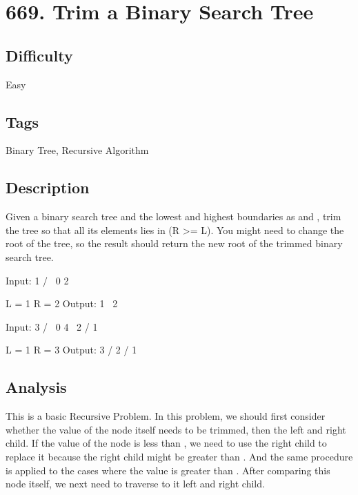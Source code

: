 \tocless\section{669. Trim a Binary Search Tree}
\label{algo:669}

\subsection*{Difficulty}
Easy

\subsection*{Tags}
Binary Tree, Recursive Algorithm

\subsection*{Description}
Given a binary search tree and the lowest and highest boundaries as  and , trim the tree so that all its elements lies in \inlinecode{[L, R]} (R >= L). You might need to change the root of the tree, so the result should return the new root of the trimmed binary search tree.

\begin{example}
\begin{multilinecode}
Input:
    1
   / \
  0   2

  L = 1
  R = 2
Output:
    1
     \
      2
\end{multilinecode}
\end{example}

\begin{example}
\begin{multilinecode}
Input:
    3
   / \
  0   4
   \
    2
   /
  1
    
  L = 1
  R = 3
Output:
      3
     / 
    2   
   /
  1
\end{multilinecode}
\end{example}

\subsection*{Analysis}
This is a basic Recursive Problem. In this problem, we should first consider whether the value of the node itself needs to be trimmed, then the left and right child. If the value of the node is less than , we need to use the right child to replace it because the right child might be greater than . And the same procedure is applied to the cases where the value is greater than . After comparing this node itself, we next need to traverse to it left and right child.

